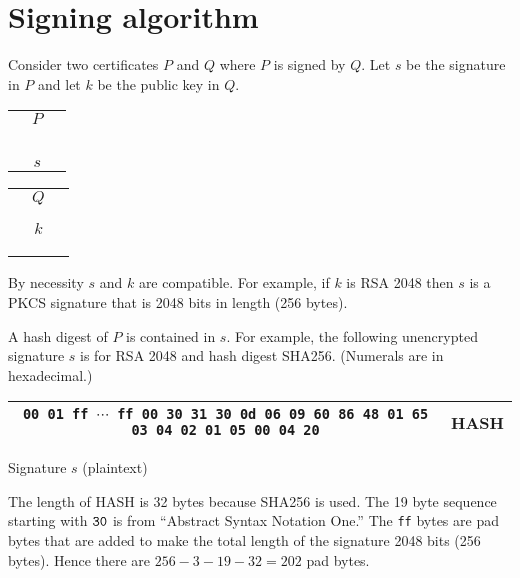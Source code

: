 \documentclass[12pt]{article}
\begin{document}
\tableofcontents

\newpage
\section{Signing algorithm}

\noindent
Consider two certificates $P$ and $Q$ where $P$ is signed by $Q$.
Let $s$ be the signature in $P$ and let $k$ be the public
key in $Q$.

\begin{center}
\begin{tabular}{|c|}
\hline
$\quad P\quad$\\
\\
\\
\\
\\
\\
\hline
$s$\\
\hline
\end{tabular}
\qquad
\begin{tabular}{|c|}
\hline
$\quad Q\quad$\\
\\
\\
\hline
$k$\\
\hline
\\
\\
\\
\hline
\end{tabular}
\end{center}

\noindent
By necessity $s$ and $k$ are compatible.
For example, if $k$ is RSA 2048 then $s$ is a PKCS signature that is 2048 bits in length
(256 bytes).

\bigskip
\noindent
A hash digest of $P$ is contained in $s$.
For example, the following unencrypted signature $s$ is for RSA 2048 and hash digest SHA256.
(Numerals are in hexadecimal.)

\begin{center}
\begin{tabular}{|c|c|}
\hline
{\footnotesize\tt 00 01 ff $\cdots$ ff 00 30 31 30 0d 06 09 60 86 48 01 65 03 04 02 01 05 00 04 20} & HASH\\
\hline
\end{tabular}

\medskip
Signature $s$ (plaintext)
\end{center}

\noindent
The length of HASH is 32 bytes because SHA256 is used.
The 19 byte sequence starting with $\tt 30$ is from
``Abstract Syntax Notation One.''
The {\tt ff} bytes are pad bytes that are added to make the total length of the signature 2048 bits (256 bytes).
Hence there are $256-3-19-32=202$ pad bytes.
\end{document}
